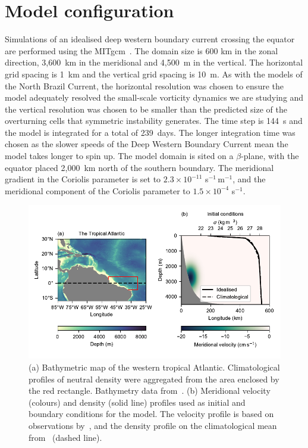 \section{Model configuration}
\label{sec:methods}
Simulations of an idealised deep western boundary current crossing the equator are performed using the MITgcm~\citep{Marshall1997}. The domain size is 600 km in the zonal direction, 3,600~km in the meridional and 4,500~m in the vertical. The horizontal grid spacing is 1~km and the vertical grid spacing is 10~m. As with the models of the North Brazil Current, the horizontal resolution was chosen to ensure the model adequately resolved the small-scale vorticity dynamics we are studying and the vertical resolution was chosen to be smaller than the predicted size of the overturning cells that symmetric instability generates\footnotemark. The time step is 144~s and the model is integrated for a total of 239~days. The longer integration time was chosen as the slower speeds of the Deep Western Boundary Current mean the model takes longer to spin up. The model domain is sited on a $\beta$-plane, with the equator placed 2,000~km north of the southern boundary. The meridional gradient in the Coriolis parameter is set to $2.3 \times 10^{-11}$ s$^{-1}\,$m$^{-1}$, and the meridional component of the Coriolis parameter to $1.5 \times 10^{-4}$ s$^{-1}$.

\begin{figure}[h]
    \centering
    \includegraphics[width=\textwidth]{../figures/Figure1.pdf}
    \caption{(a) Bathymetric map of the western tropical Atlantic. Climatological profiles of neutral density were aggregated from the area enclosed by the red rectangle. Bathymetry data from~\citet{GEBCO2020}. (b) Meridional velocity (colours) and density (solid line) profiles used as initial and boundary conditions for the model. The velocity profile is based on observations by~\citet{Schott2005}, and the density profile on the climatological mean from~\citet{WOA2018} (dashed line).}
    \label{fig:fig1}
\end{figure}

